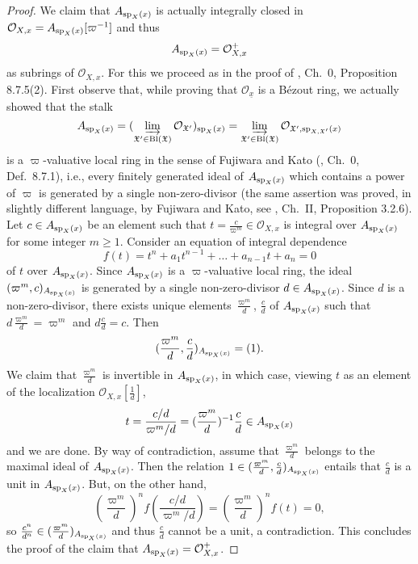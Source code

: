 \documentclass[12pt,twoside,a4paper]{article}
\theoremstyle{definition}
\theoremstyle{remark}
\newcommand\Bl{{\rm Bl}}
\newcommand\spc{{\rm sp}}
\begin{document}
\begin{proof}
We claim that $A_{\spc_{X}(x)}$ is actually integrally closed in $\mathcal{O}_{X,x}=A_{\spc_{X}(x)}[\varpi^{-1}]$ and thus \begin{equation*}A_{\spc_{X}(x)}=\mathcal{O}_{X,x}^{+}\end{equation*}as subrings of $\mathcal{O}_{X,x}$. For this we proceed as in the proof of \cite{FK}, Ch.~0, Proposition 8.7.5(2). First observe that, while proving that $\mathcal{O}_{\underline{x}}$ is a Bézout ring, we actually showed that the stalk \begin{equation*}A_{\spc_{X}(x)}=(\varinjlim_{\mathfrak{X}'\in\Bl(\mathfrak{X})}\mathcal{O}_{\mathfrak{X}'})_{\spc_{X}(x)}=\varinjlim_{\mathfrak{X}'\in\Bl(\mathfrak{X})}\mathcal{O}_{\mathfrak{X}',\spc_{X,\mathfrak{X}'}(x)}\end{equation*}is a $\varpi$-valuative local ring in the sense of Fujiwara and Kato (\cite{FK}, Ch.~0, Def.~8.7.1), i.e., every finitely generated ideal of $A_{\spc_{X}(x)}$ which contains a power of $\varpi$ is generated by a single non-zero-divisor (the same assertion was proved, in slightly different language, by Fujiwara and Kato, see \cite{FK}, Ch.~II, Proposition 3.2.6). Let $c\in A_{\spc_{X}(x)}$ be an element such that $t=\frac{c}{\varpi^{m}}\in\mathcal{O}_{X,x}$ is integral over $A_{\spc_{X}(x)}$ for some integer $m\geq1$. Consider an equation of integral dependence\begin{equation*}f(t)=t^{n}+a_{1}t^{n-1}+\dots+a_{n-1}t+a_{n}=0\end{equation*}of $t$ over $A_{\spc_{X}(x)}$. Since $A_{\spc_{X}(x)}$ is a $\varpi$-valuative local ring, the ideal $(\varpi^{m}, c)_{A_{\spc_{X}(x)}}$ is generated by a single non-zero-divisor $d\in A_{\spc_{X}(x)}$. Since $d$ is a non-zero-divisor, there exists unique elements $\frac{\varpi^{m}}{d}$, $\frac{c}{d}$ of $A_{\spc_{X}(x)}$ such that $d\frac{\varpi^{m}}{d}=\varpi^{m}$ and $d\frac{c}{d}=c$. Then \begin{equation*}(\frac{\varpi^{m}}{d}, \frac{c}{d})_{A_{\spc_{X}(x)}}=(1).\end{equation*}We claim that $\frac{\varpi^{m}}{d}$ is invertible in $A_{\spc_{X}(x)}$, in which case, viewing $t$ as an element of the localization $\mathcal{O}_{X,x}[\frac{1}{d}]$, \begin{equation*}t=\frac{c/d}{\varpi^{m}/d}=(\frac{\varpi^{m}}{d})^{-1}\frac{c}{d}\in A_{\spc_{X}(x)}\end{equation*}and we are done. By way of contradiction, assume that $\frac{\varpi^{m}}{d}$ belongs to the maximal ideal of $A_{\spc_{X}(x)}$. Then the relation $1\in (\frac{\varpi^{m}}{d}, \frac{c}{d})_{A_{\spc_{X}(x)}}$ entails that $\frac{c}{d}$ is a unit in $A_{\spc_{X}(x)}$. But, on the other hand, \begin{equation*}(\frac{\varpi^{m}}{d})^{n}f(\frac{c/d}{\varpi^{m}/d})=(\frac{\varpi^{m}}{d})^{n}f(t)=0,\end{equation*}so $\frac{c^{n}}{d^{n}}\in (\frac{\varpi^{m}}{d})_{A_{\spc_{X}(x)}}$ and thus $\frac{c}{d}$ cannot be a unit, a contradiction. This concludes the proof of the claim that $A_{\spc_{X}(x)}=\mathcal{O}_{X,x}^{+}$.   


\end{proof}
\end{document}
